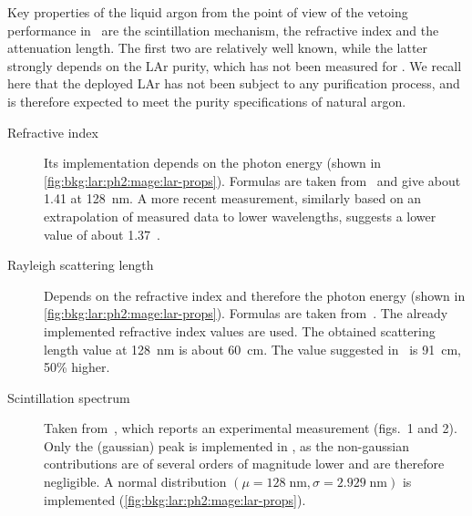 Key properties of the liquid argon from the point of view of the vetoing performance in
\gerda\ are the scintillation mechanism, the refractive index and the attenuation length.
The first two are relatively well known, while the latter strongly depends on the LAr
purity, which has not been measured for \gerda. We recall here that the deployed LAr has
not been subject to any purification process, and is therefore expected to meet the purity
specifications of natural argon.

\begin{description}

  \item[Refractive index] Its implementation depends on the photon energy (shown in
    \cref{fig:bkg:lar:ph2:mage:lar-props}). Formulas are taken from~\cite{Bideau-Mehu1981}
    and give about 1.41 at 128~nm. A more recent measurement, similarly based on an
    extrapolation of measured data to lower wavelengths, suggests a lower value of about
    1.37~\cite{Babicz2018}.

  \item[Rayleigh scattering length] Depends on the refractive index and therefore the
    photon energy (shown in \cref{fig:bkg:lar:ph2:mage:lar-props}). Formulas are taken
    from~\cite{Seidel2002}. The already implemented refractive index values are used. The
    obtained scattering length value at 128~nm is about 60~cm. The value suggested
    in~\cite{Babicz2018} is 91~cm, 50\% higher.

  \item[Scintillation spectrum] Taken from~\cite{Heindl2010}, which reports an
    experimental measurement (figs.~1 and 2). Only the (gaussian) peak is implemented in
    \mage, as the non-gaussian contributions are of several orders of magnitude lower and
    are therefore negligible. A normal distribution $(\mu=128\;\text{nm},
    \sigma=2.929\;\text{nm})$ is implemented (\cref{fig:bkg:lar:ph2:mage:lar-props}).


\end{description}
